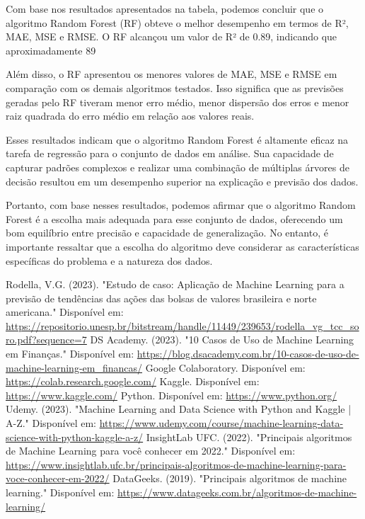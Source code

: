 \documentclass[conference]{IEEEtran}
\begin{document}
Com base nos resultados apresentados na tabela, podemos concluir que o algoritmo Random Forest (RF) obteve o melhor desempenho em termos de R², MAE, MSE e RMSE. O RF alcançou um valor de R² de 0.89, indicando que aproximadamente 89%

Além disso, o RF apresentou os menores valores de MAE, MSE e RMSE em comparação com os demais algoritmos testados. Isso significa que as previsões geradas pelo RF tiveram menor erro médio, menor dispersão dos erros e menor raiz quadrada do erro médio em relação aos valores reais.

Esses resultados indicam que o algoritmo Random Forest é altamente eficaz na tarefa de regressão para o conjunto de dados em análise. Sua capacidade de capturar padrões complexos e realizar uma combinação de múltiplas árvores de decisão resultou em um desempenho superior na explicação e previsão dos dados.

Portanto, com base nesses resultados, podemos afirmar que o algoritmo Random Forest é a escolha mais adequada para esse conjunto de dados, oferecendo um bom equilíbrio entre precisão e capacidade de generalização. No entanto, é importante ressaltar que a escolha do algoritmo deve considerar as características específicas do problema e a natureza dos dados.

\renewcommand{\refname}{Referências}

\begin{thebibliography}{00}
 Rodella, V.G. (2023). "Estudo de caso: Aplicação de Machine Learning para a previsão de tendências das ações das bolsas de valores brasileira e norte americana." Disponível em: \url{https://repositorio.unesp.br/bitstream/handle/11449/239653/rodella_vg_tcc_soro.pdf?sequence=7}
 DS Academy. (2023). "10 Casos de Uso de Machine Learning em Finanças." Disponível em: \url{https://blog.dsacademy.com.br/10-casos-de-uso-de-machine-learning-em_financas/}
 Google Colaboratory. Disponível em: \url{https://colab.research.google.com/}
 Kaggle. Disponível em: \url{https://www.kaggle.com/}
 Python. Disponível em: \url{https://www.python.org/}
 Udemy. (2023). "Machine Learning and Data Science with Python and Kaggle | A-Z." Disponível em: \url{https://www.udemy.com/course/machine-learning-data-science-with-python-kaggle-a-z/}
 InsightLab UFC. (2022). "Principais algoritmos de Machine Learning para você conhecer em 2022." Disponível em: \url{https://www.insightlab.ufc.br/principais-algoritmos-de-machine-learning-para-voce-conhecer-em-2022/}
 DataGeeks. (2019). "Principais algoritmos de machine learning." Disponível em: \url{https://www.datageeks.com.br/algoritmos-de-machine-learning/}
\end{thebibliography}
\vspace{12pt}
\end{document}
